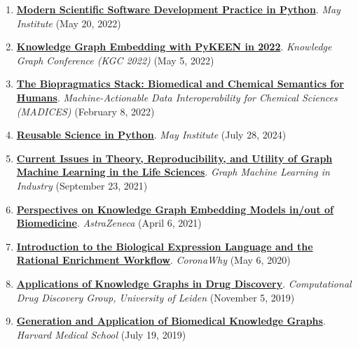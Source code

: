 \documentclass[10pt,a4paper,sans]{moderncv} %
\begin{document}
\begin{enumerate}
    \item \textbf{\href{https://www.youtube.com/watch?v=PSRdj6ysWUA}{Modern Scientific Software Development Practice in Python}}. \textit{May Institute} (May 20, 2022)

    \item \textbf{\href{https://bit.ly/pykeen-kgc2022}{Knowledge Graph Embedding with PyKEEN in 2022}}. \textit{Knowledge Graph Conference (KGC 2022)} (May 5, 2022)

    \item \textbf{\href{https://docs.google.com/presentation/d/1D0HIX41IgVdTQYKlakWcvlZvOktX23EqbLcs3LmI7mg/edit?usp=sharing}{The Biopragmatics Stack: Biomedical and Chemical Semantics for Humans}}. \textit{Machine-Actionable Data Interoperability for Chemical Sciences (MADICES)} (February 8, 2022)

    \item \textbf{\href{https://www.youtube.com/watch?v=f6brWkO9OiE}{Reusable Science in Python}}. \textit{May Institute} (July 28, 2024)

    \item \textbf{\href{https://www.youtube.com/watch?v=bLN1V5fZD2g&t=3665s}{Current Issues in Theory, Reproducibility, and Utility of Graph Machine Learning in the Life Sciences}}. \textit{Graph Machine Learning in Industry} (September 23, 2021)

    \item \textbf{\href{https://bit.ly/3wvP8yq}{Perspectives on Knowledge Graph Embedding Models in/out of Biomedicine}}. \textit{AstraZeneca} (April 6, 2021)

    \item \textbf{\href{https://youtu.be/rHhuVBpoKdI}{Introduction to the Biological Expression Language and the Rational Enrichment Workflow}}. \textit{CoronaWhy} (May 6, 2020)

    \item \textbf{\href{https://docs.google.com/presentation/d/1NQHQSD2EjOh-9XD6ffr2rDqs8AwOQ3wSBoie-e7-OXU/edit?usp=sharing}{Applications of Knowledge Graphs in Drug Discovery}}. \textit{Computational Drug Discovery Group, University of Leiden} (November 5, 2019)

    \item \textbf{\href{https://docs.google.com/presentation/d/11CG_Q3JrsqqKsDhl8uXP_TZzcyALhcVLvoP_pDmQ5JA/edit?usp=sharing}{Generation and Application of Biomedical Knowledge Graphs}}. \textit{Harvard Medical School} (July 19, 2019)

\end{enumerate}
\end{document}
